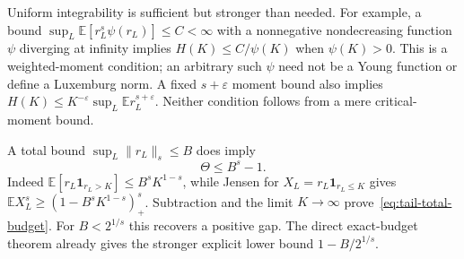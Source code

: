 \documentclass[11pt]{article}
\begin{document}
Uniform integrability is sufficient but stronger than needed. For example,
a bound $\sup_L\mathbb E[r_L^s\psi(r_L)]\le C<\infty$ with a
nonnegative nondecreasing function $\psi$ diverging at infinity implies
$H(K)\le C/\psi(K)$ when $\psi(K)>0$. This is a weighted-moment
condition; an arbitrary such $\psi$ need not be a Young function or
define a Luxemburg norm. A fixed $s+\varepsilon$ moment bound also
implies $H(K)\le K^{-\varepsilon}\sup_L\mathbb E r_L^{s+\varepsilon}$.
Neither condition follows from a mere critical-moment bound.

A total bound $\sup_L\|r_L\|_s\le B$ does imply
\begin{equation}\label{eq:tail-total-budget}
 \Theta\le B^s-1.
\end{equation}
Indeed $\mathbb E[r_L\mathbf1_{r_L>K}]\le B^sK^{1-s}$, while Jensen
for $X_L=r_L\mathbf1_{r_L\le K}$ gives
$\mathbb E X_L^s\ge(1-B^sK^{1-s})_+^s$. Subtraction and the limit
$K\to\infty$ prove~\eqref{eq:tail-total-budget}. For $B<2^{1/s}$ this
recovers a positive gap. The direct exact-budget theorem already gives
the stronger explicit lower bound $1-B/2^{1/s}$.
\end{document}
